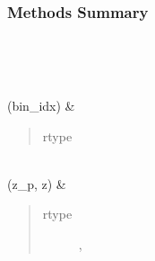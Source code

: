 \documentclass[letterpaper,10pt,english]{sphinxmanual}
\begin{document}
\begin{fulllineitems}
\begin{savenotes}
\begin{longtable}[c]{}
\begin{quote}
\begin{description}
\end{description}\end{quote}

\\
\hline
\end{longtable}\sphinxatlongtableend\end{savenotes}
\subsubsection*{Methods Summary}


\begin{savenotes}\sphinxatlongtablestart\begin{longtable}[c]{}
\hline

\endfirsthead

%
{}\\
\hline

\endhead

\hline
{}\\
\endfoot

\endlastfoot

\sphinxAtStartPar
{\hyperref[\detokenize{api/seyfert.cosmology.redshift_density.RedshiftDensity:seyfert.cosmology.redshift_density.RedshiftDensity.computeBinNormFactor}]{}}(bin\_idx)
&
\sphinxAtStartPar
\begin{quote}\begin{description}
\item[{rtype}] \leavevmode
\sphinxAtStartPar
{}

\end{description}\end{quote}

\\
\hline
\sphinxAtStartPar
{\hyperref[\detokenize{api/seyfert.cosmology.redshift_density.RedshiftDensity:seyfert.cosmology.redshift_density.RedshiftDensity.computeInstrumentResponse}]{}}(z\_p, z)
&
\sphinxAtStartPar
\begin{quote}\begin{description}
\item[{rtype}] \leavevmode
\sphinxAtStartPar
\sphinxcode{\sphinxupquote{Union}}{[}, \sphinxcode{\sphinxupquote{ndarray}}{]}


\end{description}
\end{quote}
\end{longtable}
\end{savenotes}
\end{fulllineitems}
\end{document}
